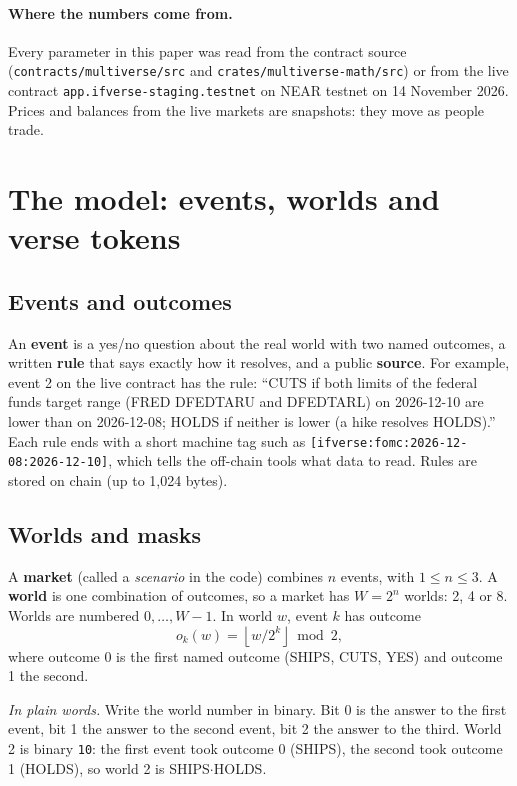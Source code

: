 \documentclass[11pt,a4paper]{article}
\newcommand{\wSH}{\textsf{SHIPS$\cdot$HOLDS}}
\newcommand{\code}[1]{\texttt{\small #1}}
\newcommand{\inwords}[1]{\par\noindent\colorbox{note}{\parbox{\dimexpr\linewidth-2\fboxsep}{\small\textit{In plain words.} #1}}\par}
\begin{document}
\paragraph{Where the numbers come from.} Every parameter in this paper was read from the contract source
(\code{contracts/multiverse/src} and \code{crates/multiverse-math/src}) or from the live contract
\code{app.ifverse-staging.testnet} on NEAR testnet on 14 November 2026. Prices and balances from the live markets are
snapshots: they move as people trade.

\section{The model: events, worlds and verse tokens}
\label{sec:model}

\subsection{Events and outcomes}

An \textbf{event} is a yes/no question about the real world with two named outcomes, a written \textbf{rule} that
says exactly how it resolves, and a public \textbf{source}. For example, event 2 on the live contract has the rule:
``CUTS if both limits of the federal funds target range (FRED DFEDTARU and DFEDTARL) on 2026-12-10 are lower than on
2026-12-08; HOLDS if neither is lower (a hike resolves HOLDS).'' Each rule ends with a short machine tag such as
\code{[ifverse:fomc:2026-12-08:2026-12-10]}, which tells the off-chain tools what data to read. Rules are stored on
chain (up to 1,024 bytes).

\subsection{Worlds and masks}

A \textbf{market} (called a \emph{scenario} in the code) combines $n$ events, with $1 \le n \le 3$. A
\textbf{world} is one combination of outcomes, so a market has $W = 2^n$ worlds: 2, 4 or 8. Worlds are numbered
$0,\dots,W-1$. In world $w$, event $k$ has outcome
\begin{equation}
  o_k(w) = \left\lfloor w / 2^k \right\rfloor \bmod 2 ,
  \label{eq:outcome}
\end{equation}
where outcome 0 is the first named outcome (\textsf{SHIPS}, \textsf{CUTS}, \textsf{YES}) and outcome 1 the second.
\inwords{Write the world number in binary. Bit 0 is the answer to the first event, bit 1 the answer to the second
event, bit 2 the answer to the third. World 2 is binary \code{10}: the first event took outcome 0 (\textsf{SHIPS}),
the second took outcome 1 (\textsf{HOLDS}), so world 2 is \wSH.}
\end{document}
